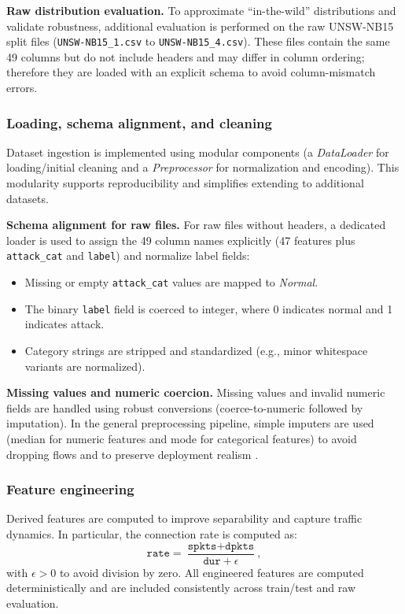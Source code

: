 \documentclass[conference]{IEEEtran}
\begin{document}
\textbf{Raw distribution evaluation.} To approximate ``in-the-wild'' distributions and validate robustness, additional evaluation is performed on the raw UNSW-NB15 split files (\texttt{UNSW-NB15\_1.csv} to \texttt{UNSW-NB15\_4.csv}). These files contain the same 49 columns but do not include headers and may differ in column ordering; therefore they are loaded with an explicit schema to avoid column-mismatch errors.

\subsubsection{Loading, schema alignment, and cleaning}
Dataset ingestion is implemented using modular components (a \emph{DataLoader} for loading/initial cleaning and a \emph{Preprocessor} for normalization and encoding). This modularity supports reproducibility and simplifies extending to additional datasets.

\textbf{Schema alignment for raw files.} For raw files without headers, a dedicated loader is used to assign the 49 column names explicitly (47 features plus \texttt{attack\_cat} and \texttt{label}) and normalize label fields:
\begin{itemize}
  \item Missing or empty \texttt{attack\_cat} values are mapped to \emph{Normal}.
  \item The binary \texttt{label} field is coerced to integer, where 0 indicates normal and 1 indicates attack.
  \item Category strings are stripped and standardized (e.g., minor whitespace variants are normalized).
\end{itemize}

\textbf{Missing values and numeric coercion.} Missing values and invalid numeric fields are handled using robust conversions (coerce-to-numeric followed by imputation). In the general preprocessing pipeline, simple imputers are used (median for numeric features and mode for categorical features) to avoid dropping flows and to preserve deployment realism \cite{Pedregosa2011Scikit}.

\subsubsection{Feature engineering}
Derived features are computed to improve separability and capture traffic dynamics. In particular, the connection rate is computed as:
\begin{equation}
\texttt{rate} = \frac{\texttt{spkts}+\texttt{dpkts}}{\texttt{dur}+\epsilon},
\end{equation}
with $\epsilon>0$ to avoid division by zero. All engineered features are computed deterministically and are included consistently across train/test and raw evaluation.
\end{document}
